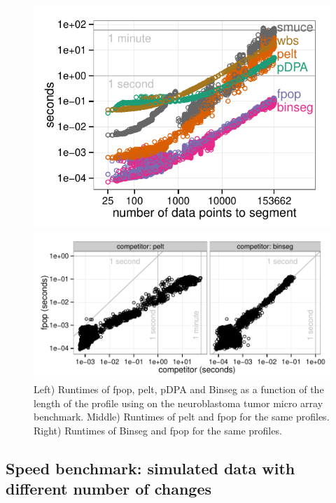 \documentclass{article}
\begin{document}
\begin{figure}\label{fig:sys_runtimes_microarray}
 \parbox{7.5cm}{ 
   \includegraphics[width=\linewidth]{figure-systemtime-arrays-small}
  }
  \parbox{11.5cm}{  
    \includegraphics[width=\linewidth]{figure-systemtime-arrays-fpop-pelt-small}
  }
  \caption{Left) Runtimes of fpop, pelt, pDPA and Binseg as a function
    of the length of the profile using on the neuroblastoma tumor micro array
    benchmark.  Middle) Runtimes of pelt and fpop for the same
    profiles.  Right) Runtimes of Binseg and fpop for the same
    profiles.  }
\end{figure}





\subsection{Speed benchmark: simulated data with different 
  number of changes}
\end{document}
